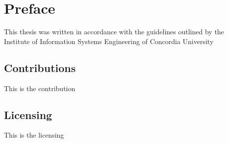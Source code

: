 \newpage
\section*{Preface}
This thesis was written in accordance with the guidelines outlined by the Institute of Information Systems Engineering of Concordia University

\subsection*{Contributions}
This is the contribution

\subsection*{Licensing}
This is the licensing